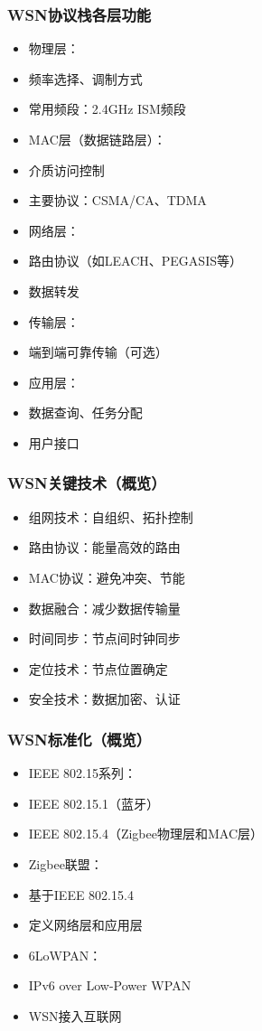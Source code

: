 \documentclass[aspectratio=43]{beamer}
\begin{document}
\begin{frame}
  \frametitle{WSN协议栈各层功能}

  \begin{itemize}
  \item<+-> 物理层：
  \item<+-> 频率选择、调制方式
  \item<+-> 常用频段：2.4GHz ISM频段
  \item<+-> MAC层（数据链路层）：
  \item<+-> 介质访问控制
  \item<+-> 主要协议：CSMA/CA、TDMA
  \item<+-> 网络层：
  \item<+-> 路由协议（如LEACH、PEGASIS等）
  \item<+-> 数据转发
  \item<+-> 传输层：
  \item<+-> 端到端可靠传输（可选）
  \item<+-> 应用层：
  \item<+-> 数据查询、任务分配
  \item<+-> 用户接口
  \end{itemize}
\end{frame}

\begin{frame}
  \frametitle{WSN关键技术（概览）}

  \begin{itemize}
  \item<+-> 组网技术：自组织、拓扑控制
  \item<+-> 路由协议：能量高效的路由
  \item<+-> MAC协议：避免冲突、节能
  \item<+-> 数据融合：减少数据传输量
  \item<+-> 时间同步：节点间时钟同步
  \item<+-> 定位技术：节点位置确定
  \item<+-> 安全技术：数据加密、认证
  \end{itemize}
\end{frame}

\begin{frame}
  \frametitle{WSN标准化（概览）}

  \begin{itemize}
  \item<+-> IEEE 802.15系列：
  \item<+-> IEEE 802.15.1（蓝牙）
  \item<+-> IEEE 802.15.4（Zigbee物理层和MAC层）
  \item<+-> Zigbee联盟：
  \item<+-> 基于IEEE 802.15.4
  \item<+-> 定义网络层和应用层
  \item<+-> 6LoWPAN：
  \item<+-> IPv6 over Low-Power WPAN
  \item<+-> WSN接入互联网
  \end{itemize}
\end{frame}
\end{document}

